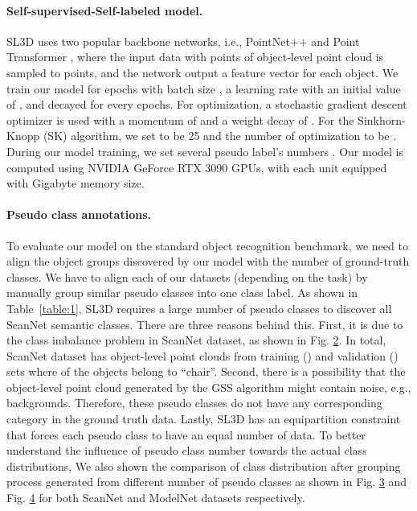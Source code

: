 \documentclass{article}
\begin{document}
\paragraph{Self-supervised-Self-labeled model. } SL3D uses two popular backbone networks, i.e., PointNet++ \cite{qi2017pointnetplusplus} and Point Transformer \cite{zhao2021point}, where the input data with  points of object-level point cloud  is sampled to  points, and the network output a  feature vector for each object. We train our model for  epochs with batch size , a learning rate with an initial value of , and decayed  for every  epochs. 
For optimization, a stochastic gradient descent optimizer is used with a momentum of  and a weight decay of . For the Sinkhorn-Knopp (SK) algorithm, we set   to be 25 and the number of optimization to be . During our model training, we set several pseudo label's numbers . Our model is computed using  NVIDIA GeForce RTX 3090 GPUs, with each unit equipped with  Gigabyte memory size. 

\paragraph{Pseudo class annotations. }To evaluate our model on the  standard object recognition benchmark, we need to align the object groups discovered by our model with the number of ground-truth classes. We have to align each of our datasets (depending on the task) by manually group similar pseudo classes into one class label. 
As shown in Table~\ref{table:1}, SL3D requires a large number of pseudo classes to discover all ScanNet semantic classes. There are three reasons behind this. First, it is due to the class imbalance problem in ScanNet dataset, as shown in Fig. \hyperref[wrap-fig:1]{2}. In total, ScanNet dataset has  object-level point clouds from training () and validation () sets where  of the objects belong to ``chair''. Second, there is a possibility that the object-level point cloud generated by the GSS algorithm might contain noise, e.g., backgrounds. Therefore, these pseudo classes do not have any corresponding category in the ground truth data. 
Lastly, SL3D has an equipartition constraint that forces each pseudo class to have an equal number of data. To better understand the influence of pseudo class number towards the actual class distributions, We also shown the comparison of class distribution after grouping process generated from different number of pseudo classes as shown in Fig. \hyperref[fig:3]{3} and Fig. \hyperref[fig:4]{4} for both ScanNet and ModelNet datasets respectively.
\end{document}
